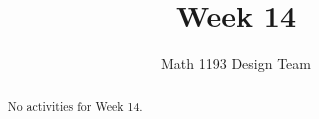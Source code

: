 \documentclass[noauthor,noinstructornotes]{ximera}
\title{Week 14}
\author{Math 1193 Design Team}
\begin{document}
\begin{abstract}
    No activities for Week 14.
\end{abstract}
\maketitle





\end{document}
